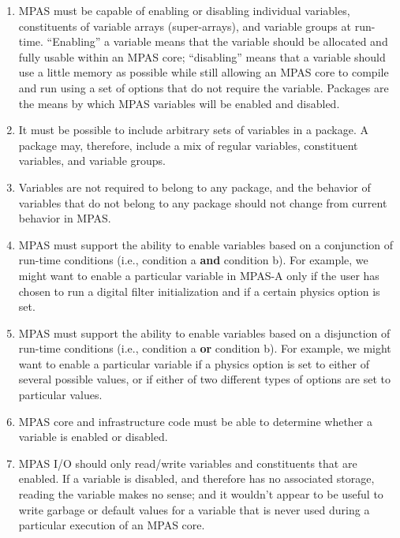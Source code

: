 \documentclass[11pt]{report}
\begin{document}
\begin{enumerate}

\item MPAS must be capable of enabling or disabling individual variables, 
   constituents of variable arrays (super-arrays), and variable groups at run-time.
   ``Enabling'' a variable means that the variable should be allocated and fully usable within
   an MPAS core; ``disabling'' means that a variable should use a little memory as possible 
   while still allowing an MPAS core to compile and run using a set of options that do not 
   require the variable. Packages are the means by which MPAS variables will be
   enabled and disabled.
   
\item It must be possible to include arbitrary sets of variables in a package. A package may, therefore,
   include a mix of regular variables, constituent variables, and variable groups. 

\item Variables are not required to belong to any package, and the behavior of variables that do
   not belong to any package should not change from current behavior in MPAS.
                                                                                                    
\item MPAS must support the ability to enable variables based on a conjunction of run-time 
   conditions (i.e., condition a {\bf and} condition b). For example, we might want to
   enable a particular variable in MPAS-A only if the user has chosen to run a digital filter initialization
   and if a certain physics option is set.
      
\item MPAS must support the ability to enable variables based on a disjunction of run-time 
   conditions (i.e., condition a {\bf or} condition b). For example, we might want to enable a
   particular variable if a physics option is set to either of several possible values, or if either of 
   two different types of options are set to particular values.
   
\item MPAS core and infrastructure code must be able to determine whether a variable is
   enabled or disabled.
   
\item MPAS I/O should only read/write variables and constituents that are enabled. If a variable
   is disabled, and therefore has no associated storage, reading the variable makes no sense; and
   it wouldn't appear to be useful to write garbage or default values for a variable that is never used
   during a particular execution of an MPAS core.

\end{enumerate}                                                             
\end{document}
